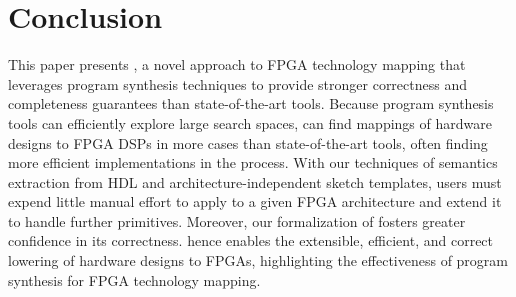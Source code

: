 \section{Conclusion}
\label{sec:lakeroad-conclusion}

This paper presents \lr, 
  a novel approach to FPGA technology mapping
  that leverages program synthesis techniques
  to provide stronger correctness and completeness guarantees 
  than state-of-the-art tools.
Because program synthesis tools
  can efficiently explore large search spaces, 
  \lr 
  can find mappings
  of hardware designs
  to FPGA DSPs
  in more cases
  than state-of-the-art tools,
  often finding more efficient implementations
  in the process.
With our techniques
  of semantics extraction
  from HDL
  and architecture-independent sketch templates,
  users must expend little manual effort 
  to apply \lr to
  a given FPGA architecture
  and extend it to handle further primitives.
Moreover, our formalization of \lr
  fosters greater confidence
  in its correctness.
\lr hence enables the 
  extensible, efficient, and correct 
  lowering of hardware designs to FPGAs,
  highlighting the effectiveness
  of program synthesis
  for FPGA technology mapping.


